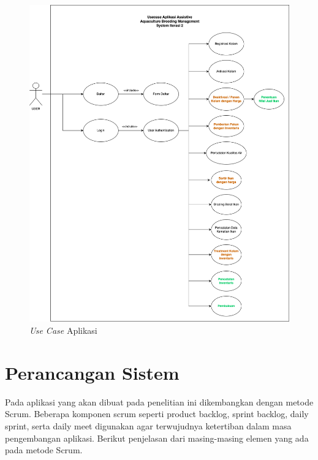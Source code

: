 \begin{spacing}{1.5}
\begin{figure}[H]
	\centering
	\includegraphics[width=1\textwidth]{gambar/usecase_iterasi_2.png}
	\caption{\textit{Use Case} Aplikasi}
\end{figure}

\section{Perancangan Sistem}

Pada aplikasi yang akan dibuat pada penelitian ini dikembangkan dengan metode Scrum. Beberapa komponen scrum seperti product backlog, sprint backlog, daily sprint, serta daily meet digunakan agar terwujudnya ketertiban dalam masa pengembangan aplikasi. Berikut penjelasan dari masing-masing elemen yang ada pada metode Scrum.


\end{spacing}
